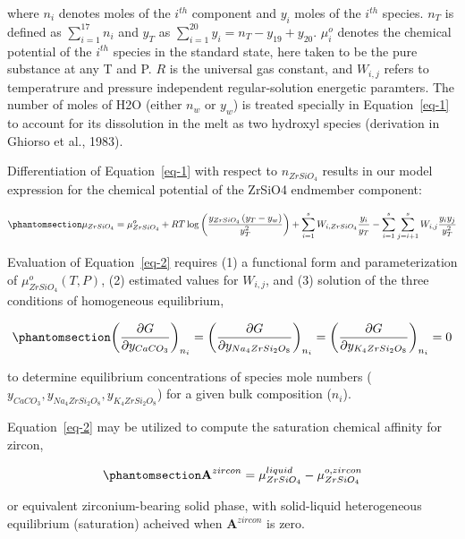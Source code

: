 \documentclass[
]{agujournal2019}
\begin{document}
where \(n_i\) denotes moles of the \(i^{th}\) component and \(y_i\)
moles of the \(i^{th}\) species. \(n_T\) is defined as
\(\sum_{i=1}^{17} n_i\) and \(y_T\) as
\(\sum_{i=1}^{20} y_i = n_T - y_{19} + y_{20}\). \(\mu_i^o\) denotes the
chemical potential of the \(i^{th}\) species in the standard state, here
taken to be the pure substance at any T and P. \(R\) is the universal
gas constant, and \(W_{i,j}\) refers to temperatrure and pressure
independent regular-solution energetic paramters. The number of moles of
H2O (either \(n_w\) or \(y_w\)) is treated specially in
Equation~\ref{eq-1} to account for its dissolution in the melt as two
hydroxyl species (derivation in Ghiorso et al., 1983).

Differentiation of Equation~\ref{eq-1} with respect to \(n_{ZrSiO_4}\)
results in our model expression for the chemical potential of the ZrSiO4
endmember component:

\begin{equation}\phantomsection\label{eq-2}{
\mu_{ZrSiO_4} = \mu_{ZrSiO_4}^o + R T \log \left( \frac{y_{ZrSiO_4} \left( y_T - y_w \right)}{y_T^2} \right) + \sum_{i=1}^s W_{i,{ZrSiO_4}} \frac{y_i}{y_T} - \sum_{i=1}^s \sum_{j=i+1}^s W_{i,j} \frac{y_i y_j}{y_T^2}
}\end{equation}

Evaluation of Equation~\ref{eq-2} requires (1) a functional form and
parameterization of \(\mu_{ZrSiO_4}^o \left( T,P \right)\), (2)
estimated values for \(W_{i,j}\), and (3) solution of the three
conditions of homogeneous equilibrium,

\begin{equation}\phantomsection\label{eq-3}{
\left( \frac{\partial G}{\partial y_{CaCO_3}} \right)_{n_i} = \left( \frac{\partial G}{\partial y_{Na_4ZrSi_2O_8}} \right)_{n_i} = \left( \frac{\partial G}{\partial y_{K_4ZrSi_2O_8}} \right)_{n_i} = 0
}\end{equation}

to determine equilibrium concentrations of species mole numbers
(\(y_{CaCO_3}, y_{Na_4ZrSi_2O_8}, y_{K_4ZrSi_2O_8}\)) for a given bulk
composition (\(n_i\)).

Equation~\ref{eq-2} may be utilized to compute the saturation chemical
affinity for zircon,

\begin{equation}\phantomsection\label{eq-4}{
\textbf{A}^{zircon} = \mu_{ZrSiO_4}^{liquid} - \mu_{ZrSiO_4}^{o,zircon}
}\end{equation}

or equivalent zirconium-bearing solid phase, with solid-liquid
heterogeneous equilibrium (saturation) acheived when
\(\textbf{A}^{zircon}\) is zero.
\end{document}
